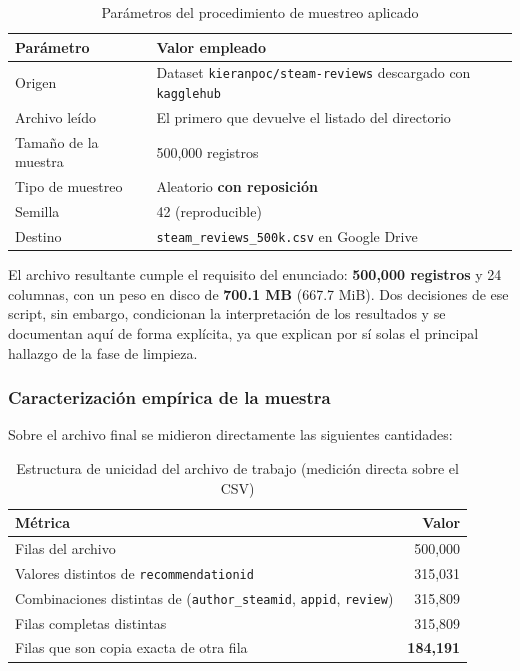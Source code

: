 \begin{table}[H]
\centering
\caption{Parámetros del procedimiento de muestreo aplicado}
\label{tab:muestreo}
\vspace{0.2cm}
\small
\begin{tabular}{@{}ll@{}}
\toprule
\textbf{Parámetro} & \textbf{Valor empleado} \\
\midrule
Origen                     & Dataset \texttt{kieranpoc/\bk{}steam-\bk{}reviews} descargado con \texttt{kagglehub} \\
Archivo leído              & El primero que devuelve el listado del directorio \\
Tamaño de la muestra       & 500,000 registros \\
Tipo de muestreo           & Aleatorio \textbf{con reposición} \\
Semilla                    & 42 (reproducible) \\
Destino                    & \texttt{steam\_\bk{}reviews\_\bk{}500k.\bk{}csv} en Google Drive \\
\bottomrule
\end{tabular}
\end{table}

El archivo resultante cumple el requisito del enunciado: \textbf{500,000 registros} y 24 columnas, con un peso en disco de \textbf{700.1 MB} (667.7 MiB). Dos decisiones de ese script, sin embargo, condicionan la interpretación de los resultados y se documentan aquí de forma explícita, ya que explican por sí solas el principal hallazgo de la fase de limpieza.

\subsubsection{Caracterización empírica de la muestra}

Sobre el archivo final se midieron directamente las siguientes cantidades:

\begin{table}[H]
\centering
\caption{Estructura de unicidad del archivo de trabajo (medición directa sobre el CSV)}
\label{tab:unicidad}
\vspace{0.2cm}
\small
\begin{tabular}{lr}
\toprule
\textbf{Métrica} & \textbf{Valor} \\
\midrule
Filas del archivo                                      & 500,000 \\
Valores distintos de \texttt{recommendationid}         & 315,031 \\
Combinaciones distintas de (\texttt{author\_steamid}, \texttt{appid}, \texttt{review}) & 315,809 \\
Filas completas distintas                              & 315,809 \\
\midrule
Filas que son copia exacta de otra fila                & \textbf{184,191} \\
\bottomrule
\end{tabular}
\end{table}

